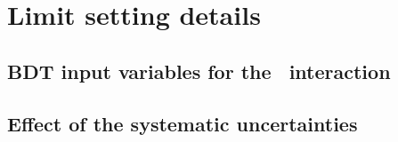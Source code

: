 \chapter{Limit setting details}

\section{BDT input variables for the \Zct\ interaction}
\label{app:BDTinput}


\newpage
\section{Effect of the systematic uncertainties}
\label{app:sys}


